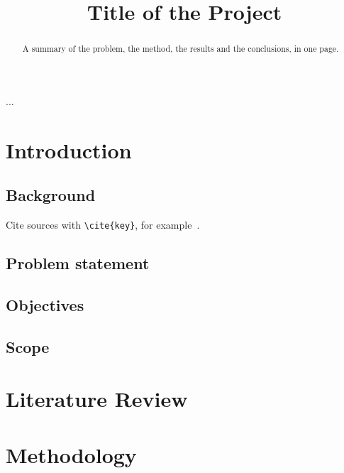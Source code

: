 \documentclass[degree=bs,bib=ieee]{saus-thesis}
\title{Title of the Project}
\begin{document}
\frontmatter
\maketitlepage
\makeapproval
\makedeclaration

\begin{acknowledgements}
...
\end{acknowledgements}

\begin{abstract}
A summary of the problem, the method, the results and the conclusions,
in one page.
\end{abstract}


\tableofcontents
\listoffigures
\listoftables

\begin{abbreviations}
\end{abbreviations}

\mainmatter
\chapter{Introduction}
\section{Background}
Cite sources with \verb|\cite{key}|, for example~\cite{lamport1994}.
\section{Problem statement}
\section{Objectives}
\section{Scope}

\chapter{Literature Review}

\chapter{Methodology}
\end{document}
